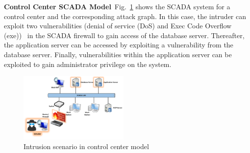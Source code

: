 \noindent\textbf{Control Center SCADA Model}\ 
Fig.~\ref{fig:model-CC} shows the SCADA system for a control center and the corresponding attack graph. In this case, the intruder can exploit two vulnerabilities (denial of service (DoS) and Exec Code Overflow (exe))~\cite{ssh} in the SCADA firewall to gain access of the database server. Thereafter, the application server can be accessed by exploiting a vulnerability from the database server. Finally, vulnerabilities within the application server can be exploited to gain administrator privilege on the system.
\begin{figure}[htbp]
	\includegraphics[width=0.48\textwidth]{CC-model.png}
	\caption{Intrusion scenario in control center model}\label{fig:model-CC}
\end{figure}

